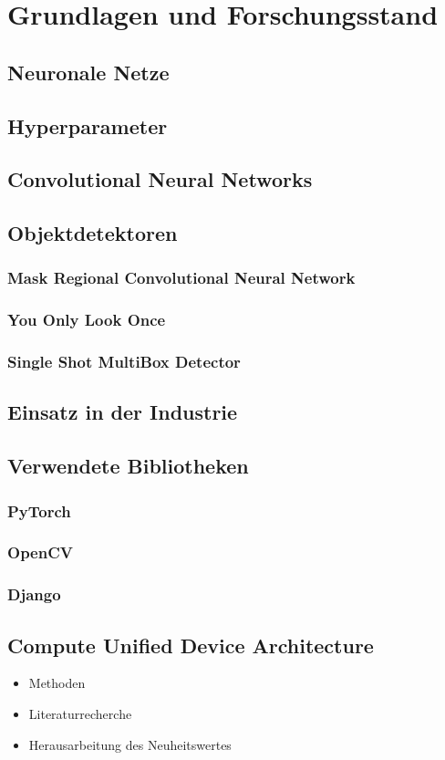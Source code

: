 \chapter{Grundlagen und Forschungsstand}

\section{Neuronale Netze}


\section{Hyperparameter}


\section{Convolutional Neural Networks}


\section{Objektdetektoren}

\subsection{Mask Regional Convolutional Neural Network}

\subsection{You Only Look Once}

\subsection{Single Shot MultiBox Detector}


\section{Einsatz in der Industrie}


\section{Verwendete Bibliotheken}

\subsection{PyTorch}

\subsection{OpenCV}

\subsection{Django}


\section{Compute Unified Device Architecture}


\begin{itemize}
	\item Methoden
	\item Literaturrecherche
	\item Herausarbeitung des Neuheitswertes 
\end{itemize}
